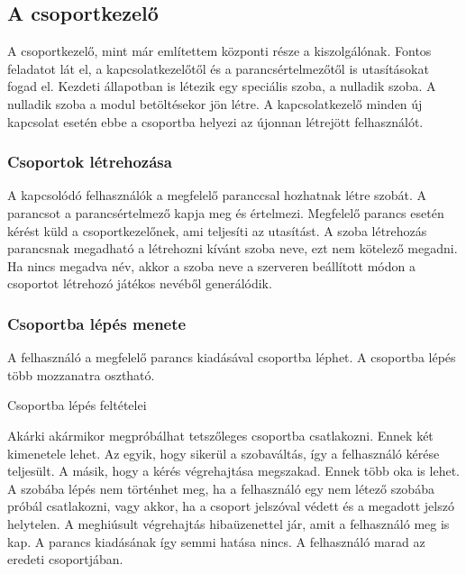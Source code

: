 \documentclass[]{article}
\begin{document}
\hypertarget{a-csoportkezelux151}{%
\subsection{A csoportkezelő}\label{a-csoportkezelux151}}

A csoportkezelő, mint már említettem központi része a kiszolgálónak.
Fontos feladatot lát el, a kapcsolatkezelőtől és a parancsértelmezőtől
is utasításokat fogad el. Kezdeti állapotban is létezik egy speciális
szoba, a nulladik szoba. A nulladik szoba a modul betöltésekor jön
létre. A kapcsolatkezelő minden új kapcsolat esetén ebbe a csoportba
helyezi az újonnan létrejött felhasználót.

\hypertarget{csoportok-luxe9trehozuxe1sa}{%
\subsubsection{Csoportok
létrehozása}\label{csoportok-luxe9trehozuxe1sa}}

A kapcsolódó felhasználók a megfelelő paranccsal hozhatnak létre szobát.
A parancsot a parancsértelmező kapja meg és értelmezi. Megfelelő parancs
esetén kérést küld a csoportkezelőnek, ami teljesíti az utasítást. A
szoba létrehozás parancsnak megadható a létrehozni kívánt szoba neve,
ezt nem kötelező megadni. Ha nincs megadva név, akkor a szoba neve a
szerveren beállított módon a csoportot létrehozó játékos nevéből
generálódik.

\hypertarget{csoportba-luxe9puxe9s-menete}{%
\subsubsection{Csoportba lépés
menete}\label{csoportba-luxe9puxe9s-menete}}

A felhasználó a megfelelő parancs kiadásával csoportba léphet. A
csoportba lépés több mozzanatra osztható.

Csoportba lépés feltételei

Akárki akármikor megpróbálhat tetszőleges csoportba csatlakozni. Ennek
két kimenetele lehet. Az egyik, hogy sikerül a szobaváltás, így a
felhasználó kérése teljesült. A másik, hogy a kérés végrehajtása
megszakad. Ennek több oka is lehet. A szobába lépés nem történhet meg,
ha a felhasználó egy nem létező szobába próbál csatlakozni, vagy akkor,
ha a csoport jelszóval védett és a megadott jelszó helytelen. A
meghiúsult végrehajtás hibaüzenettel jár, amit a felhasználó meg is kap.
A parancs kiadásának így semmi hatása nincs. A felhasználó marad az
eredeti csoportjában.
\end{document}
